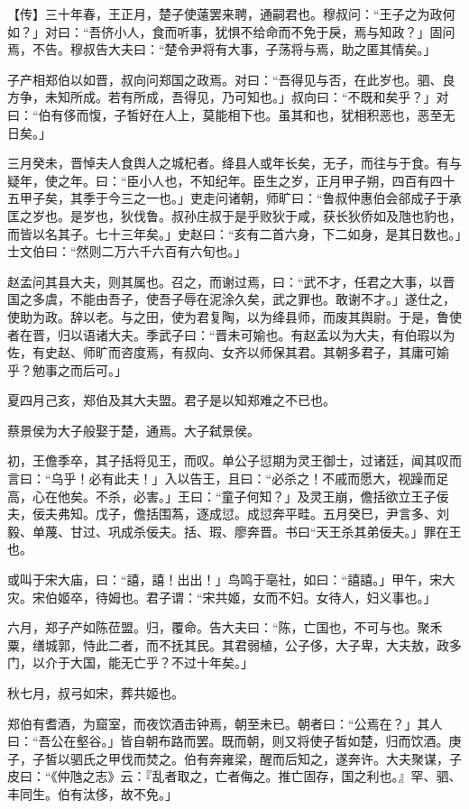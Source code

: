 \documentclass[]{article}
\begin{document}
【传】三十年春，王正月，楚子使薳罢来聘，通嗣君也。穆叔问：``王子之为政何如？」对曰：``吾侪小人，食而听事，犹惧不给命而不免于戾，焉与知政？」固问焉，不告。穆叔告大夫曰：``楚令尹将有大事，子荡将与焉，助之匿其情矣。」

子产相郑伯以如晋，叔向问郑国之政焉。对曰：``吾得见与否，在此岁也。驷、良方争，未知所成。若有所成，吾得见，乃可知也。」叔向曰：``不既和矣乎？」对曰：``伯有侈而愎，子皙好在人上，莫能相下也。虽其和也，犹相积恶也，恶至无日矣。」

三月癸未，晋悼夫人食舆人之城杞者。绛县人或年长矣，无子，而往与于食。有与疑年，使之年。曰：``臣小人也，不知纪年。臣生之岁，正月甲子朔，四百有四十五甲子矣，其季于今三之一也。」吏走问诸朝，师旷曰：``鲁叔仲惠伯会郤成子于承匡之岁也。是岁也，狄伐鲁。叔孙庄叔于是乎败狄于咸，获长狄侨如及虺也豹也，而皆以名其子。七十三年矣。」史赵曰：``亥有二首六身，下二如身，是其日数也。」士文伯曰：``然则二万六千六百有六旬也。」

赵孟问其县大夫，则其属也。召之，而谢过焉，曰：``武不才，任君之大事，以晋国之多虞，不能由吾子，使吾子辱在泥涂久矣，武之罪也。敢谢不才。」遂仕之，使助为政。辞以老。与之田，使为君复陶，以为绛县师，而废其舆尉。于是，鲁使者在晋，归以语诸大夫。季武子曰：``晋未可媮也。有赵孟以为大夫，有伯瑕以为佐，有史赵、师旷而咨度焉，有叔向、女齐以师保其君。其朝多君子，其庸可媮乎？勉事之而后可。」

夏四月己亥，郑伯及其大夫盟。君子是以知郑难之不已也。

蔡景侯为大子般娶于楚，通焉。大子弑景侯。

初，王儋季卒，其子括将见王，而叹。单公子愆期为灵王御士，过诸廷，闻其叹而言曰：``乌乎！必有此夫！」入以告王，且曰：``必杀之！不戚而愿大，视躁而足高，心在他矣。不杀，必害。」王曰：``童子何知？」及灵王崩，儋括欲立王子佞夫，佞夫弗知。戊子，儋括围蒍，逐成愆。成愆奔平畦。五月癸巳，尹言多、刘毅、单蔑、甘过、巩成杀佞夫。括、瑕、廖奔晋。书曰``天王杀其弟佞夫。」罪在王也。

或叫于宋大庙，曰：``譆，譆！出出！」鸟鸣于亳社，如曰：``譆譆。」甲午，宋大灾。宋伯姬卒，待姆也。君子谓：``宋共姬，女而不妇。女待人，妇义事也。」

六月，郑子产如陈莅盟。归，覆命。告大夫曰：``陈，亡国也，不可与也。聚禾粟，缮城郭，恃此二者，而不抚其民。其君弱植，公子侈，大子卑，大夫敖，政多门，以介于大国，能无亡乎？不过十年矣。」

秋七月，叔弓如宋，葬共姬也。

郑伯有耆酒，为窟室，而夜饮酒击钟焉，朝至未已。朝者曰：``公焉在？」其人曰：``吾公在壑谷。」皆自朝布路而罢。既而朝，则又将使子皙如楚，归而饮酒。庚子，子皙以驷氏之甲伐而焚之。伯有奔雍梁，醒而后知之，遂奔许。大夫聚谋，子皮曰：``《仲虺之志》云：『乱者取之，亡者侮之。推亡固存，国之利也。』罕、驷、丰同生。伯有汰侈，故不免。」
\end{document}

